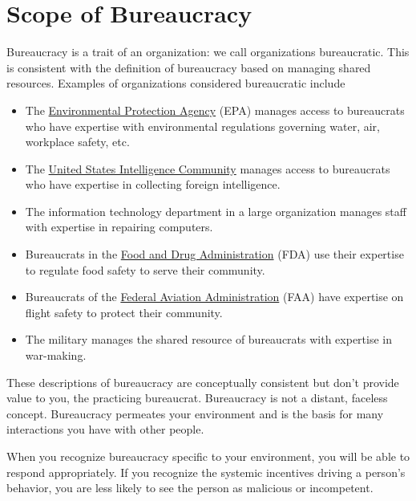 \section{Scope of Bureaucracy}
Bureaucracy is a trait of an organization: we call organizations bureaucratic. This is consistent with the definition of bureaucracy based on managing \glspl{shared resource}. 
\marginpar{[Glossary]}
Examples of organizations considered bureaucratic include
  \begin{itemize}
      \item The \href{https://www.epa.gov/}{Environmental Protection Agency} (EPA) manages access to bureaucrats who have expertise with environmental regulations governing water, air, workplace safety, etc.
      \item The \href{https://www.intelligence.gov/}{United States Intelligence Community} manages access to bureaucrats who have expertise in collecting foreign intelligence.
      \item The information technology department in a large organization manages staff with expertise in repairing computers.
      \item Bureaucrats in the \href{https://www.fda.gov/}{Food and Drug Administration} (FDA) use their expertise to regulate food safety to serve their community.
      \item Bureaucrats of the \href{https://www.faa.gov/}{Federal Aviation Administration} (FAA) have expertise on flight safety to protect their community.
      \item The military manages the shared resource of bureaucrats with expertise in war-making.
  \end{itemize}

These descriptions of bureaucracy are conceptually consistent but don't provide value to you, the practicing bureaucrat. Bureaucracy is not a distant, faceless concept. Bureaucracy permeates your environment and is the basis for many interactions you have with other people. 

When you recognize bureaucracy specific to your environment, you will be able to respond appropriately. If you recognize the systemic incentives driving a person's behavior, you are less likely to see the person as malicious or incompetent. 